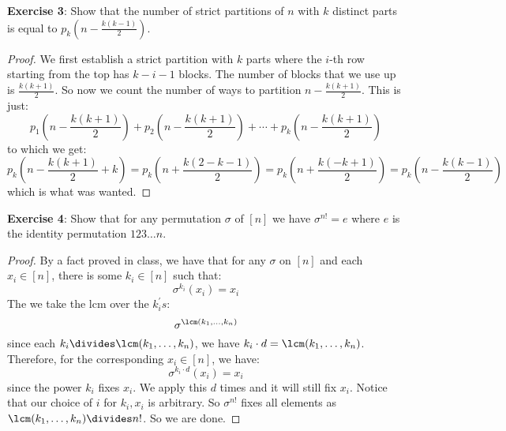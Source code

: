 \documentclass{article}
\begin{document}
\textbf{Exercise 3}: Show that the number of strict partitions of $n$ with $k$ distinct parts is equal to $p_{k}\left(n - \frac{k(k - 1)}{2}\right)$.
    \begin{proof}
        We first establish a strict partition with $k$ parts where the $i$-th row starting from the top has $k - i - 1$ blocks. The number of blocks that we use up is $\frac{k(k + 1)}{2}$. So now we count the number of ways to partition $n - \frac{k(k + 1)}{2}$. This is just:
            \begin{equation*}
                p_{1}(n - \frac{k(k + 1)}{2}) + p_{2}(n - \frac{k(k + 1)}{2}) + \cdots +p_{k}(n - \frac{k(k + 1)}{2})
            \end{equation*}
        to which we get:
            \begin{equation*}
                p_{k}\left(n - \dfrac{k(k + 1)}{2} + k\right) = p_{k}\left(n + \dfrac{k(2 - k - 1)}{2}\right) = p_{k}\left(n + \dfrac{k(-k + 1)}{2}\right) = p_{k}\left(n - \dfrac{k(k - 1)}{2}\right)
            \end{equation*}
        which is what was wanted. 
    \end{proof}

\textbf{Exercise 4}: Show that for any permutation $\sigma$ of $[n]$ we have $\sigma^{n!} = e$ where $e$ is the identity permutation $123\ldots n$.
    \begin{proof}
        By a fact proved in class, we have that for any $\sigma$ on $[n]$ and each $x_{i} \in [n]$, there is some $k_{i} \in [n]$ such that:
            \begin{equation*}
                \sigma^{k_{i}}(x_{i}) = x_{i}
            \end{equation*}
        The we take the lcm over the $k_{i}^{\prime}s$:
            \begin{equation*}
                \sigma^{\lcm(k_{1}, \ldots ,  k_{n})}
            \end{equation*}
        since each $k_{i} \divides \lcm(k_{1}, \ldots , k_{n})$, we have $k_{i} \cdot d = \lcm(k_{1}, \ldots , k_{n})$. Therefore, for the corresponding $x_{i} \in [n]$, we have:
            \begin{equation*}
                \sigma^{k_{i} \cdot d}(x_{i}) = x_{i}
            \end{equation*}
        since the power $k_{i}$ fixes $x_{i}$. We apply this $d$ times and it will still fix $x_{i}$. Notice that our choice of $i$ for $k_{i}, x_{i}$ is arbitrary. So $\sigma^{n!}$ fixes all elements as $\lcm(k_{1}, \ldots , k_{n}) \divides n!$. So we are done.
    \end{proof}
\end{document}
